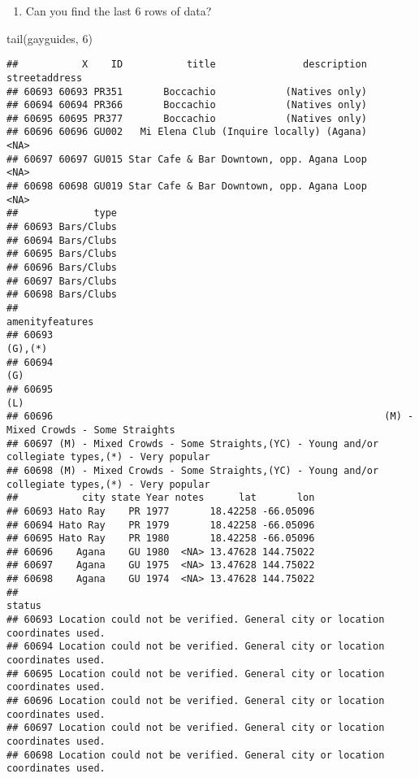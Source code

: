 \documentclass[
]{article}
\newenvironment{Shaded}{\begin{snugshade}}{\end{snugshade}}
\newcommand{\DecValTok}[1]{\textcolor[rgb]{0.00,0.00,0.81}{#1}}
\newcommand{\FunctionTok}[1]{\textcolor[rgb]{0.00,0.00,0.00}{#1}}
\newcommand{\NormalTok}[1]{#1}
\providecommand{\tightlist}{%
  \setlength{\itemsep}{0pt}\setlength{\parskip}{0pt}}
\begin{document}
\begin{enumerate}
\def\labelenumi{(\arabic{enumi})}
\setcounter{enumi}{20}
\tightlist
\item
  Can you find the last 6 rows of data?
\end{enumerate}

\begin{Shaded}
\begin{Highlighting}[]
\FunctionTok{tail}\NormalTok{(gayguides, }\DecValTok{6}\NormalTok{)}
\end{Highlighting}
\end{Shaded}

\begin{verbatim}
##           X    ID           title               description streetaddress
## 60693 60693 PR351       Boccachio            (Natives only)              
## 60694 60694 PR366       Boccachio            (Natives only)              
## 60695 60695 PR377       Boccachio            (Natives only)              
## 60696 60696 GU002   Mi Elena Club (Inquire locally) (Agana)          <NA>
## 60697 60697 GU015 Star Cafe & Bar Downtown, opp. Agana Loop          <NA>
## 60698 60698 GU019 Star Cafe & Bar Downtown, opp. Agana Loop          <NA>
##             type
## 60693 Bars/Clubs
## 60694 Bars/Clubs
## 60695 Bars/Clubs
## 60696 Bars/Clubs
## 60697 Bars/Clubs
## 60698 Bars/Clubs
##                                                                                   amenityfeatures
## 60693                                                                                     (G),(*)
## 60694                                                                                         (G)
## 60695                                                                                         (L)
## 60696                                                         (M) - Mixed Crowds - Some Straights
## 60697 (M) - Mixed Crowds - Some Straights,(YC) - Young and/or collegiate types,(*) - Very popular
## 60698 (M) - Mixed Crowds - Some Straights,(YC) - Young and/or collegiate types,(*) - Very popular
##           city state Year notes      lat       lon
## 60693 Hato Ray    PR 1977       18.42258 -66.05096
## 60694 Hato Ray    PR 1979       18.42258 -66.05096
## 60695 Hato Ray    PR 1980       18.42258 -66.05096
## 60696    Agana    GU 1980  <NA> 13.47628 144.75022
## 60697    Agana    GU 1975  <NA> 13.47628 144.75022
## 60698    Agana    GU 1974  <NA> 13.47628 144.75022
##                                                                           status
## 60693 Location could not be verified. General city or location coordinates used.
## 60694 Location could not be verified. General city or location coordinates used.
## 60695 Location could not be verified. General city or location coordinates used.
## 60696 Location could not be verified. General city or location coordinates used.
## 60697 Location could not be verified. General city or location coordinates used.
## 60698 Location could not be verified. General city or location coordinates used.
\end{verbatim}
\end{document}
